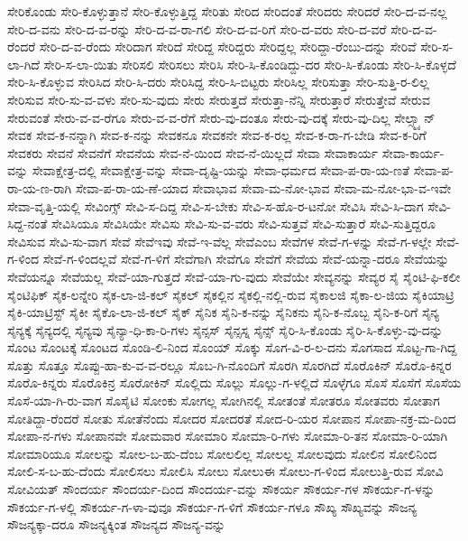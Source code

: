 {ಸೇರಿಕೊಂಡು
ಸೇರಿ-ಕೊಳ್ಳುತ್ತಾನೆ
ಸೇರಿ-ಕೊಳ್ಳುತ್ತಿದ್ದ
ಸೇರಿತು
ಸೇರಿದ
ಸೇರಿದಂತೆ
ಸೇರಿದರು
ಸೇರಿದರೆ
ಸೇರಿ-ದ-ವ-ನಲ್ಲ
ಸೇರಿ-ದ-ವನು
ಸೇರಿ-ದ-ವ-ರನ್ನು
ಸೇರಿ-ದ-ವ-ರಾ-ಗಲಿ
ಸೇರಿ-ದ-ವ-ರಿಗೆ
ಸೇರಿ-ದ-ವರು
ಸೇರಿ-ದ-ವರೆ
ಸೇರಿ-ದ-ವ-ರೆಂದರೆ
ಸೇರಿ-ದ-ವ-ರೆಂದು
ಸೇರಿದಾಗ
ಸೇರಿದೆ
ಸೇರಿದ್ದ
ಸೇರಿದ್ದರು
ಸೇರಿದ್ದಲ್ಲ
ಸೇರಿದ್ದಾ-ರೆಂಬು-ದನ್ನು
ಸೇರಿವೆ
ಸೇರಿ-ಸ-ಲಾ-ಗಿದೆ
ಸೇರಿ-ಸ-ಲಾ-ಯಿತು
ಸೇರಿಸಲಿ
ಸೇರಿಸಲು
ಸೇರಿಸಿ
ಸೇರಿ-ಸಿ-ಕೊಂಡಿದ್ದು-ದರ
ಸೇರಿ-ಸಿ-ಕೊಂಡು
ಸೇರಿ-ಸಿ-ಕೊಳ್ಳದೆ
ಸೇರಿ-ಸಿ-ಕೊಳ್ಳುವ
ಸೇರಿಸಿದ
ಸೇರಿ-ಸಿ-ದರು
ಸೇರಿಸಿದ್ದ
ಸೇರಿ-ಸಿ-ಬಿಟ್ಟರು
ಸೇರಿಸಿಲ್ಲ
ಸೇರಿಸುತ್ತಾ
ಸೇರಿ-ಸುತ್ತಿ-ರ-ಲಿಲ್ಲ
ಸೇರಿಸುವ
ಸೇರಿ-ಸು-ವ-ವಳು
ಸೇರಿ-ಸು-ವುದು
ಸೇರು
ಸೇರುತ್ತದೆ
ಸೇರುತ್ತಾ-ನೆನ್ನಿ
ಸೇರುತ್ತಾರೆ
ಸೇರುತ್ತೇವೆ
ಸೇರುವ
ಸೇರುವಂತೆ
ಸೇರು-ವ-ವ-ರೆಗೂ
ಸೇರು-ವ-ವ-ರೆಗೆ
ಸೇರು-ವು-ದಂತೂ
ಸೇರು-ವು-ದಕ್ಕೆ
ಸೇರು-ವು-ದಿಲ್ಲ
ಸೇಲ್ಸ್ಮ್ಯಾನ್
ಸೇವಕ
ಸೇವ-ಕ-ನನ್ನಾಗಿ
ಸೇವ-ಕ-ನನ್ನು
ಸೇವಕನೂ
ಸೇವಕನೇ
ಸೇವ-ಕ-ರಲ್ಲ
ಸೇವ-ಕ-ರಾ-ಗ-ಬೇಡಿ
ಸೇವ-ಕ-ರಿಗೆ
ಸೇವಕರು
ಸೇವನೆ
ಸೇವನೆಗೆ
ಸೇವನೆಯ
ಸೇವ-ನೆ-ಯಿಂದ
ಸೇವ-ನೆ-ಯಿಲ್ಲದೆ
ಸೇವಾ
ಸೇವಾಕಾರ್ಯ
ಸೇವಾ-ಕಾರ್ಯ-ವನ್ನು
ಸೇವಾಕ್ಷೇತ್ರ-ದಲ್ಲಿ
ಸೇವಾಕ್ಷೇತ್ರ-ವನ್ನು
ಸೇವಾ-ದೃಷ್ಟಿ-ಯನ್ನು
ಸೇವಾ-ಧರ್ಮದ
ಸೇವಾ-ಪ-ರಾ-ಯ-ಣತೆ
ಸೇವಾ-ಪ-ರಾ-ಯ-ಣ-ರಾಗಿ
ಸೇವಾ-ಪ-ರಾ-ಯ-ಣೆ-ಯಾದ
ಸೇವಾಭಾವ
ಸೇವಾ-ಮ-ನೋ-ಭಾವ
ಸೇವಾ-ಮ-ನೋ-ಭಾ-ವ-ಇವೇ
ಸೇವಾ-ವೃತ್ತಿ-ಯಲ್ಲಿ
ಸೇವಿಂಗ್ಸ್
ಸೇವಿ-ಸ-ದಿದ್ದ
ಸೇವಿ-ಸ-ಬೇಕು
ಸೇವಿ-ಸ-ಹೊ-ರ-ಟನೋ
ಸೇವಿಸಿ
ಸೇವಿ-ಸಿ-ದಾಗ
ಸೇವಿ-ಸಿದ್ದ-ನಂತೆ
ಸೇವಿಸಿಯೂ
ಸೇವಿಸಿಯೇ
ಸೇವಿಸು
ಸೇವಿ-ಸು-ವ-ವರು
ಸೇವಿ-ಸುತ್ತವೆ
ಸೇವಿ-ಸುತ್ತಾರೆ
ಸೇವಿ-ಸುತ್ತಿದ್ದರೂ
ಸೇವಿಸುವ
ಸೇವಿ-ಸು-ವಾಗ
ಸೇವೆ
ಸೇವೆಇವು
ಸೇವೆ-ಇ-ವೆಲ್ಲ
ಸೇವೆಎಂಬ
ಸೇವೆಗಳ
ಸೇವೆ-ಗ-ಳನ್ನು
ಸೇವೆ-ಗ-ಳಲ್ಲೇ
ಸೇವೆ-ಗ-ಳಿಂದ
ಸೇವೆ-ಗ-ಳಿಂದಲ್ಲವೆ
ಸೇವೆ-ಗ-ಳಿಗೆ
ಸೇವೆಗಾಗಿ
ಸೇವೆಗೂ
ಸೇವೆಗೆ
ಸೇವೆಯ
ಸೇವೆ-ಯನ್ನಾ-ದರೂ
ಸೇವೆಯನ್ನು
ಸೇವೆಯನ್ನೂ
ಸೇವೆಯಲ್ಲ
ಸೇವೆ-ಯಾ-ಗುತ್ತದೆ
ಸೇವೆ-ಯಾ-ಗು-ವುದು
ಸೇವೆಯೇ
ಸೇವ್ಯನನ್ನು
ಸೇವ್ಯರ
ಸೈ
ಸೈಂಟಿ-ಫಿ-ಕಲೀ
ಸೈಂಟಿಫಿಕ್
ಸೈಕ-ಲನ್ನೇರಿ
ಸೈಕ-ಲಾ-ಜಿ-ಕಲ್
ಸೈಕಲ್
ಸೈಕಲ್ಲಿನ
ಸೈಕಲ್ಲಿ-ನಲ್ಲಿ-ರುವ
ಸೈಕಾಲಜಿ
ಸೈಕಾ-ಲ-ಜಿಯ
ಸೈಕಿಯಾಟ್ರಿ
ಸೈಕಿ-ಯಾಟ್ರಿಸ್ಟ್
ಸೈಕೀ
ಸೈಕೊ-ಲಾ-ಜಿ-ಕಲ್
ಸೈಕ್
ಸೈನಿಕ
ಸೈನಿ-ಕ-ನನ್ನು
ಸೈನಿಕನು
ಸೈನಿ-ಕ-ನೊಬ್ಬ
ಸೈನಿ-ಕ-ರಿಗೆ
ಸೈನ್ಯ
ಸೈನ್ಯಕ್ಕೆ
ಸೈನ್ಯದಲ್ಲಿ
ಸೈನ್ಯವು
ಸೈನ್ಯಾ-ಧಿ-ಕಾ-ರಿ-ಗಳು
ಸೈನ್ಸಸ್
ಸೈನ್ಸಸ್ನ
ಸೈನ್ಸ್
ಸೈರಿ-ಸಿ-ಕೊಂಡು
ಸೈರಿ-ಸಿ-ಕೊಳ್ಳು-ವು-ದನ್ನು
ಸೊಂಟ
ಸೊಂಟಕ್ಕೆ
ಸೊಂಟದ
ಸೊಂಡಿ-ಲಿ-ನಿಂದ
ಸೊಂಯ್
ಸೊಕ್ಕು
ಸೊಗ-ವಿ-ರ-ಲ-ದನು
ಸೊಗಸಾದ
ಸೊಟ್ಟ-ಗಾ-ಗಿದ್ದ
ಸೊತ್ತು
ಸೊತ್ತೂ
ಸೊಪ್ಪು-ಹಾ-ಕು-ವ-ವ-ರಲ್ಲೂ
ಸೊಬ-ಗಿ-ನೊಂದಿಗೆ
ಸೊರಗಿ
ಸೊರಗಿದೆ
ಸೊರೊಕಿನ್
ಸೊರೊ-ಕಿನ್ನರ
ಸೊರೊ-ಕಿನ್ನರು
ಸೊರೊಕಿನ್ರ
ಸೊರೋಕಿನ್
ಸೊಲ್ಲಿದು
ಸೊಲ್ಲು
ಸೊಲ್ಲು-ಗ-ಳಲ್ಲಿದೆ
ಸೊಳ್ಳೆಗೂ
ಸೊಸೆ
ಸೊಸೆಗೆ
ಸೊಸೆಯ
ಸೊಸೆ-ಯಾ-ಗಿ-ರು-ವಾಗ
ಸೊಸೈಟಿ
ಸೋಂಕು
ಸೋಗಲ್ಲ
ಸೋಗಿನಲ್ಲಿ
ಸೋತಂತೆ
ಸೋತರೂ
ಸೋತವರು
ಸೋತಾಗ
ಸೋತಿದ್ದಾ-ರೆಂದರೆ
ಸೋತು
ಸೋತೆನೆಂದು
ಸೋದರ
ಸೋದರತೆ
ಸೋದ-ರಿ-ಯರ
ಸೋಪಾನ
ಸೋಪಾ-ನಕ್ರ-ಮ-ದಿಂದ
ಸೋಪಾ-ನ-ಗಳು
ಸೋಪಾನವೇ
ಸೋಮವಾರ
ಸೋಮಾರಿ
ಸೋಮಾ-ರಿ-ಗಳು
ಸೋಮಾ-ರಿ-ತನ
ಸೋಮಾ-ರಿ-ಯಾಗಿ
ಸೋಮಾರಿಯೂ
ಸೋಲನ್ನು
ಸೋಲ-ಬ-ಹು-ದೆಂಬ
ಸೋಲಲಿಲ್ಲ
ಸೋಲಲ್ಲ
ಸೋಲವುದು
ಸೋಲಿನ
ಸೋಲಿನಿಂದ
ಸೋಲಿ-ಸ-ಬ-ಹು-ದೆಂದು
ಸೋಲಿಸಲು
ಸೋಲಿಸಿ
ಸೋಲು
ಸೋಲುಈ
ಸೋಲು-ಗ-ಳಿಂದ
ಸೋಲುತ್ತಿ-ರುವ
ಸೋವಿ
ಸೋವಿಯತ್
ಸೌಂದರ್ಯ
ಸೌಂದರ್ಯ-ದಿಂದ
ಸೌಂದರ್ಯ-ವನ್ನು
ಸೌಕರ್ಯ
ಸೌಕರ್ಯ-ಗಳ
ಸೌಕರ್ಯ-ಗ-ಳನ್ನು
ಸೌಕರ್ಯ-ಗ-ಳಲ್ಲಿ
ಸೌಕರ್ಯ-ಗ-ಳಾ-ವುವೂ
ಸೌಕರ್ಯ-ಗ-ಳಿಗೆ
ಸೌಕರ್ಯ-ಗಳೂ
ಸೌಖ್ಯ
ಸೌಖ್ಯವನ್ನು
ಸೌಜನ್ಯ
ಸೌಜನ್ಯಕ್ಕಾ-ದರೂ
ಸೌಜನ್ಯಕ್ಕಿಂತ
ಸೌಜನ್ಯದ
ಸೌಜನ್ಯ-ವನ್ನು
}
